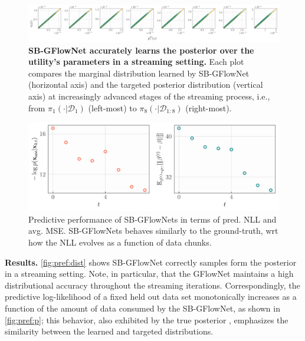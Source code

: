 \documentclass{article}
\newcommand{\pp}[1]{\vspace{0pt}\noindent\textbf{#1}}
\theoremstyle{plain}
\theoremstyle{definition}
\theoremstyle{remark}
\theoremstyle{remark}
\begin{document}
\begin{figure}[!t] 
    \centering
    \includegraphics[width=\textwidth]{figures/distributional_approx.pdf}
    \caption{\textbf{SB-GFlowNet accurately learns the posterior over the utility's parameters in a streaming setting.} Each plot compares the marginal distribution learned by SB-GFlowNet (horizontal axis) and the targeted posterior distribution (vertical axis) at increasingly advanced stages of the streaming process, i.e., from $\pi_{1}( \cdot | \mathcal{D}_{1})$ (left-most) to $\pi_{8}(\cdot | \mathcal{D}_{1:8})$ (right-most).} 
    \label{fig:pref:dist}
\end{figure}
\captionsetup[figure]{font=small}
\begin{figure}  
    \centering
    \vspace{-8pt} 
    \includegraphics[width=\linewidth]{figures/predictive_nll_preferences.pdf} 
        \caption{Predictive performance of SB-GFlowNets in terms of pred. NLL and avg. MSE. SB-GFlowNets behaves similarly to the ground-truth, wrt how the NLL evolves as a function of data chunks.} %
    \label{fig:pref:p}
    \vspace{-15pt} 
\end{figure}
\captionsetup[figure]{font=normal}
\pp{Results.} \autoref{fig:pref:dist} shows SB-GFlowNet correctly %
samples form the posterior %
in a streaming setting. Note, in particular, that the GFlowNet maintains a high distributional accuracy throughout the streaming iterations. Correspondingly, the predictive log-likelihood of a fixed held out data set monotonically increases as a function of the amount of data consumed by the SB-GFlowNet, as shown in \autoref{fig:pref:p}; this behavior, also exhibited by the true posterior \cite{Walker1969}, emphasizes the similarity between the learned and targeted distributions.  
\end{document}

